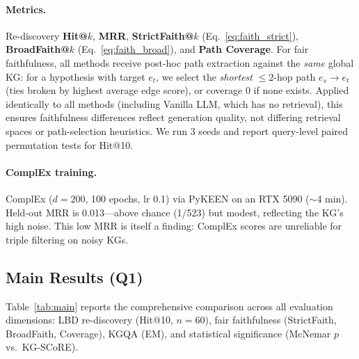 \paragraph{Metrics.}
Re-discovery \textbf{Hit@$k$}, \textbf{MRR}, \textbf{StrictFaith@$k$} (Eq.~\ref{eq:faith_strict}), \textbf{BroadFaith@$k$} (Eq.~\ref{eq:faith_broad}), and \textbf{Path Coverage}. For fair faithfulness, all methods receive post-hoc path extraction against the \emph{same} global KG: for a hypothesis with target $e_t$, we select the \emph{shortest} $\leq$2-hop path $e_s\!\to\!e_t$ (ties broken by highest average edge score), or coverage 0 if none exists. Applied identically to all methods (including Vanilla LLM, which has no retrieval), this ensures faithfulness differences reflect generation quality, not differing retrieval spaces or path-selection heuristics. We run 3 seeds and report query-level paired permutation tests for Hit@10.

\paragraph{ComplEx training.}
ComplEx ($d{=}200$, 100 epochs, lr 0.1) via PyKEEN on an RTX 5090 ($\sim$4 min). Held-out MRR is 0.013---above chance (1/523) but modest, reflecting the KG's high noise. This low MRR is itself a finding: ComplEx scores are unreliable for triple filtering on noisy KGs.

\subsection{Main Results (Q1)}
\label{sec:exp:main}

Table~\ref{tab:main} reports the comprehensive comparison across all evaluation dimensions: LBD re-discovery (Hit@10, $n{=}60$), fair faithfulness (StrictFaith, BroadFaith, Coverage), KGQA (EM), and statistical significance (McNemar $p$ vs.\ KG-SCoRE).


